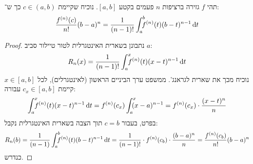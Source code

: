 \documentclass[]{../../../../tex/classes/homework}
\newcommand\Is{\dequad \ }
\begin{document}
	\section{}
	תהי $f$ גזירה ברציפות $n$ פעמים בקטע $[a, b]$. נוכיח שקיימת $c \in (a, b)$ כך ש־: 
	\[ \frac{f^{(n)}(c)}{n!}(b -a)^{n} = \frac{1}{(n - 1)!}\int^{b}_a \Is f^{(n)}(t)(b -t)^{n - 1}\dt \]
	\begin{proof}
		נתבונן בשארית האינטגרלית לטור טיילור סביב $a$: 
		\[ R_{n}(x) = \frac{1}{(n - 1)!}\int^{x}_a\Is f^{(n)}(t)(x - t)^{n - 1}\dt \]
		נוכיח מכך את שארית לגראנג'. ממשפט ערך הביניים הראשון (לאינטגרלים), לכל $x \in [a, b]$ קיימת $c_x \in [a, b]$ עבורה: 
		\[ \int^{x}_a \Is f^{(n)}(t)(x - t)^{n - 1}\dt = f^{(n)}(c_x)\int^{x}_a\Is (x - a)^{n -1} = f^{(n)}(c_x) \cdot \frac{(x - t)^{n}}{n} \]
		בפרט, בעבור $c = b$ תוך הצבה בשארית האינטגרלית נקבל: 
		\[ R_{n}(b) = \frac{1}{(n - 1)}\int^{b}_a \Is f^{(n)}(t)(b - t)^{n - 1}\dt = \frac{1}{(n - 1)!} \cdot f^{(n)}(c_b) \cdot \frac{(b - a)^{n}}{n} = \frac{f^{(n)}(c_b)}{n!}(b - a)^{n} \]
		כנדרש. 
	\end{proof}
	
\end{document}
